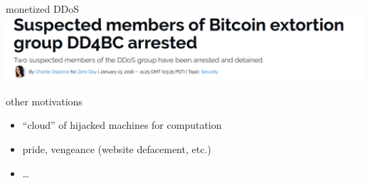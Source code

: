 \begin{frame}{monetized DDoS}
    \includegraphics[width=\textwidth]{../intro/ddos-ext-head}  
\end{frame}

\begin{frame}{other motivations}
    \begin{itemize}
    \item ``cloud'' of hijacked machines for computation
    \item pride, vengeance (website defacement, etc.)
    \item \ldots
    \end{itemize}
\end{frame}

